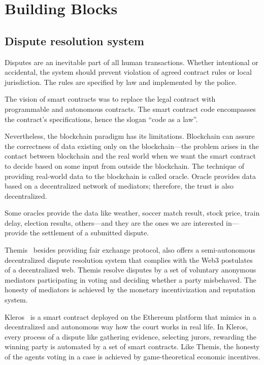 \documentclass{ieeeaccess}
\begin{document}
\section{Building Blocks}\label{sec:building-blocks}
\subsection{Dispute resolution system}

Disputes are an inevitable part of all human transactions. Whether intentional or accidental, the system should prevent violation of agreed contract rules or local jurisdiction. The rules are specified by law and implemented by the police.

The vision of smart contracts was to replace the legal contract with
programmable and autonomous contracts. The smart contract code encompasses the contract's specifications, hence the slogan ``code as a law''. 

Nevertheless, the blockchain paradigm has its limitations. Blockchain can assure the correctness of data existing only on the blockchain—the problem arises in the contact between blockchain and the real world when we want the smart contract to decide based on some input from outside the blockchain. The technique of providing real-world data to the blockchain is called oracle. Oracle provides data based on a decentralized network of mediators; therefore, the trust is also decentralized.

Some oracles provide the data like weather, soccer match result, stock
price, train delay, election results, others—and they are the ones we
are interested in—provide the settlement of a submitted dispute.

Themis~\cite{meng2019themis} besides providing fair exchange protocol,
also offers a semi-autonomous decentralized dispute resolution system that complies with the Web3 postulates of a decentralized web. Themis
resolve disputes by a set of voluntary anonymous mediators participating
in voting and deciding whether a party misbehaved. The honesty of
mediators is achieved by the monetary incentivization and reputation
system.

Kleros~\cite{lesaege2018kleros} is a smart contract deployed on the Ethereum platform that mimics in a decentralized and autonomous way how the court works in real life. In Kleros, every process of a dispute like gathering evidence, selecting jurors, rewarding the winning party is automated by a set of smart contracts. Like Themis, the honesty of the agents voting in a case is achieved by game-theoretical economic incentives.
\end{document}
